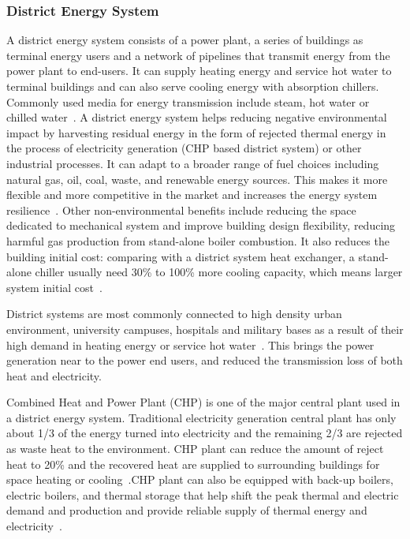 \documentclass[hidelinks,12pt]{article}
\begin{document}
\subsubsection{District Energy System}
A district energy system consists of a power plant, a series of
buildings as terminal energy users and a network of pipelines that
transmit energy from the power plant to end-users. It can supply
heating energy and service hot water to terminal buildings and can
also serve cooling energy with absorption chillers. Commonly used
media for energy transmission include steam, hot water or chilled
water~\cite{baird2014}. A district energy system helps reducing
negative environmental impact by harvesting residual energy in the
form of rejected thermal energy in the process of electricity
generation (CHP based district system) or other industrial
processes. It can adapt to a broader range of fuel choices including
natural gas, oil, coal, waste, and renewable energy sources. This
makes it more flexible and more competitive in the market and
increases the energy system resilience~\cite{IDEA2005}. Other
non-environmental benefits include reducing the space dedicated to
mechanical system and improve building design flexibility, reducing
harmful gas production from stand-alone boiler combustion.  It also
reduces the building initial cost: comparing with a district system
heat exchanger, a stand-alone chiller usually need 30\% to 100\% more
cooling capacity, which means larger system initial
cost~\cite{IDEA2005}.

District systems are most commonly connected to high density urban
environment, university campuses, hospitals and military bases as a
result of their high demand in heating energy or service hot
water~\cite{IDEA2005}. This brings the power generation near to the
power end users, and reduced the transmission loss of both heat and
electricity.

Combined Heat and Power Plant (CHP) is one of the major central plant
used in a district energy system. Traditional electricity generation
central plant has only about 1/3 of the energy turned into electricity
and the remaining 2/3 are rejected as waste heat to the
environment. CHP plant can reduce the amount of reject heat to 20\%
and the recovered heat are supplied to surrounding buildings for space
heating or cooling~\cite{IDEA2005}.CHP plant can also be equipped with
back-up boilers, electric boilers, and thermal storage that help shift
the peak thermal and electric demand and production and provide
reliable supply of thermal energy and electricity~\cite{IDEA2012}.
\end{document}
